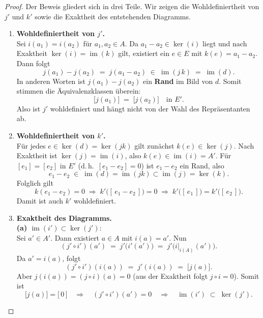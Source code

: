 \documentclass[12pt]{article}
\numberwithin{conj}{section}
\newcommand{\ima}{\operatorname{im}}
\begin{document}
\begin{proof}
    Der Beweis gliedert sich in drei Teile. Wir zeigen die Wohldefiniertheit von $j'$ und $k'$ sowie die Exaktheit des entstehenden Diagramms.
    
    \begin{enumerate}[nolistsep]
        \item \textbf{Wohldefiniertheit von $j'$.} \\
              Sei $i(a_1) = i(a_2)$ für $a_1, a_2 \in A$. Da $a_1 - a_2 \in \ker(i)$ liegt und nach Exaktheit $\ker(i) = \ima(k)$ gilt, existiert ein $e \in E$ mit $k(e) = a_1 - a_2$. Dann folgt
              \[
                j(a_1) - j(a_2) \;=\; j(a_1 - a_2)
                \;\in\; \ima(j\,k) \;=\; \ima(d).
              \]
              In anderen Worten ist $j(a_1) - j(a_2)$ ein \textbf{Rand} im Bild von $d$. Somit stimmen die Äquivalenzklassen überein:
              \[
                \bigl[j(a_1)\bigr]
                \;=\;
                \bigl[j(a_2)\bigr]
                \quad\text{in } E'.
              \]
              Also ist $j'$ wohldefiniert und hängt nicht von der Wahl des Repräsentanten ab.
              
        \item \textbf{Wohldefiniertheit von $k'$.} \\
              Für jedes $e \in \ker(d) = \ker(jk)$ gilt zunächst $k(e) \in \ker(j)$. Nach Exaktheit ist $\ker(j) = \ima(i)$, also $k(e) \in \ima(i) = A'$. Für $[e_1] = [e_2]$ in $E'$ (d.\,h.\ $[e_1 - e_2] = 0$) ist $e_1 - e_2$ ein Rand, also
              \[
                e_1 - e_2 \;\in\; \ima(d) = \ima(jk) \subset \ima(j) = \ker(k).
              \]
              Folglich gilt
              \[
                k(e_1 - e_2) = 0
                \;\Longrightarrow\;
                k'\bigl([\,e_1 - e_2\,]\bigr) = 0
                \;\Longrightarrow\;
                k'\bigl([\,e_1\,]\bigr) = k'\bigl([\,e_2\,]\bigr).
              \]
              Damit ist auch $k'$ wohldefiniert.
              
        \item \textbf{Exaktheit des Diagramms.} \\
              \textbf{(a) $\ima(i') \subset \ker(j')$}:\\
              Sei $a' \in A'$. Dann existiert $a \in A$ mit $i(a) = a'$. Nun
              \[
                (j' \circ i')(a')
                \;=\;
                j'\bigl(i'(a')\bigr)
                \;=\;
                j'\bigl(i\vert_{i(A)}(a')\bigr).
              \]
              Da $a' = i(a)$, folgt
              \[
                (j' \circ i')(i(a))
                \;=\; j'(i(a))
                \;=\; \bigl[j(a)\bigr].
              \]
              Aber $j(i(a)) = (j \circ i)(a) = 0$ (aus der Exaktheit folgt $j \circ i = 0$). Somit ist
              \[
                \bigl[j(a)\bigr] = \bigl[\,0\,\bigr]
                \quad\Longrightarrow\quad
                (j' \circ i')(a') = 0
                \quad\Longrightarrow\quad
                \ima(i') \;\subset\; \ker(j').
              \]
              

\end{enumerate}
\end{proof}
\end{document}
